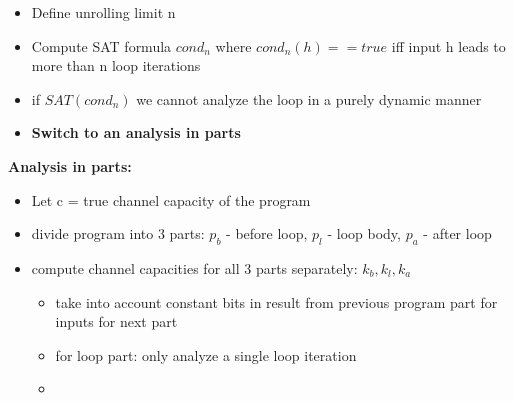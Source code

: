 \begin{itemize}
    \item Define unrolling limit n
    \item Compute SAT formula $cond_n$ where $cond_n(h) == true$ iff input h leads to more than n loop iterations
    \item if $SAT(cond_n)$ we cannot analyze the loop in a purely dynamic manner
    \item \textbf{Switch to an analysis in parts}
\end{itemize}

\textbf{Analysis in parts:}
\begin{itemize}
    \item Let c = true channel capacity of the program
    \item divide program into 3 parts: $p_b$ - before loop, $p_l$ - loop body, $p_a$ - after loop
    \item compute channel capacities for all 3 parts separately: $k_b, k_l, k_a$
    
    \begin{itemize}
        \item take into account constant bits in result from previous program part for inputs for next part
        \item for loop part: only analyze a single loop iteration
        \item {}
    \end{itemize}
    

\end{itemize}
